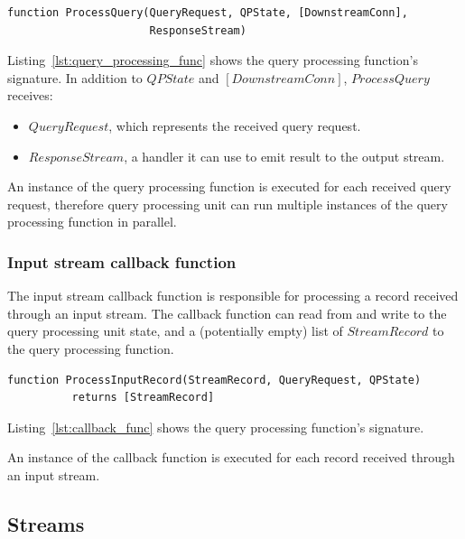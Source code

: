 \begin{lstlisting}[caption={Query processing function signature},captionpos=b,label={lst:query_processing_func}]
function ProcessQuery(QueryRequest, QPState, [DownstreamConn],
                      ResponseStream)
\end{lstlisting}

\noindent
\begin{sloppypar}
Listing~\ref{lst:query_processing_func} shows the query processing function's signature.
In addition to $QPState$ and $[DownstreamConn]$, $ProcessQuery$ receives:
\end{sloppypar}
\begin{itemize}
  \item $QueryRequest$, which represents the received query request.

  \item $ResponseStream$, a handler it can use to emit result to the output stream.

\end{itemize}

An instance of the query processing function is executed for each received query request,
therefore query processing unit can run multiple instances of the query processing function in parallel.

\subsubsection{Input stream callback function}
\label{sec:callback_func}

The input stream callback function is responsible for processing a record received through an input stream.
The callback function can read from and write to the query processing unit state,
and a (potentially empty) list of $StreamRecord$ to the query processing function.

\begin{lstlisting}[caption={Input stream callback function signature},captionpos=b,label={lst:callback_func}]
function ProcessInputRecord(StreamRecord, QueryRequest, QPState)
          returns [StreamRecord]
\end{lstlisting}

\noindent
Listing~\ref{lst:callback_func} shows the query processing function's signature.

An instance of the callback function is executed for each record received through an input stream.

\subsection{Streams}
\todo{}


